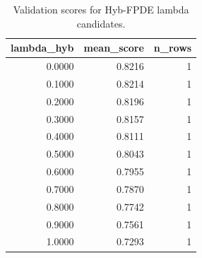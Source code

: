 \begin{table}[t]
\caption{Validation scores for Hyb-FPDE lambda candidates.}
\label{tab:lambda_distribution_computed}
\centering
\begin{tabular}{rrr}
\toprule
lambda\_hyb & mean\_score & n\_rows \\
\midrule
0.0000 & 0.8216 & 1 \\
0.1000 & 0.8214 & 1 \\
0.2000 & 0.8196 & 1 \\
0.3000 & 0.8157 & 1 \\
0.4000 & 0.8111 & 1 \\
0.5000 & 0.8043 & 1 \\
0.6000 & 0.7955 & 1 \\
0.7000 & 0.7870 & 1 \\
0.8000 & 0.7742 & 1 \\
0.9000 & 0.7561 & 1 \\
1.0000 & 0.7293 & 1 \\
\bottomrule
\end{tabular}

\end{table}
